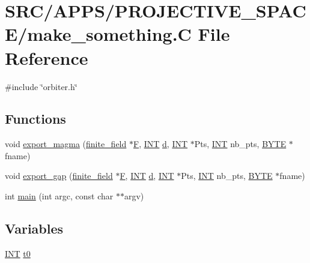 \hypertarget{make__something_8_c}{}\section{S\+R\+C/\+A\+P\+P\+S/\+P\+R\+O\+J\+E\+C\+T\+I\+V\+E\+\_\+\+S\+P\+A\+C\+E/make\+\_\+something.C File Reference}
\label{make__something_8_c}
{\ttfamily \#include \char`\"{}orbiter.\+h\char`\"{}}\newline
\subsection*{Functions}
\begin{DoxyCompactItemize}
\item 
void \mbox{\hyperlink{make__something_8_c_a24d47d809bb1982155fab1fa6e86b7b6}{export\+\_\+magma}} (\mbox{\hyperlink{classfinite__field}{finite\+\_\+field}} $\ast$\mbox{\hyperlink{simeon_8_c_a21a61c535ff7d9d4b674461d3b19fffa}{F}}, \mbox{\hyperlink{galois_8h_a09fddde158a3a20bd2dcadb609de11dc}{I\+NT}} \mbox{\hyperlink{simeon_8_c_a4339ca06fa882e69473d37bd6d7917d1}{d}}, \mbox{\hyperlink{galois_8h_a09fddde158a3a20bd2dcadb609de11dc}{I\+NT}} $\ast$Pts, \mbox{\hyperlink{galois_8h_a09fddde158a3a20bd2dcadb609de11dc}{I\+NT}} nb\+\_\+pts, \mbox{\hyperlink{galois_8h_ab6cc7b4aeb6ea31aba2b3fbfc83ff5e6}{B\+Y\+TE}} $\ast$fname)
\item 
void \mbox{\hyperlink{make__something_8_c_a2df5ce810ead281d3e2c885149bcfb7c}{export\+\_\+gap}} (\mbox{\hyperlink{classfinite__field}{finite\+\_\+field}} $\ast$\mbox{\hyperlink{simeon_8_c_a21a61c535ff7d9d4b674461d3b19fffa}{F}}, \mbox{\hyperlink{galois_8h_a09fddde158a3a20bd2dcadb609de11dc}{I\+NT}} \mbox{\hyperlink{simeon_8_c_a4339ca06fa882e69473d37bd6d7917d1}{d}}, \mbox{\hyperlink{galois_8h_a09fddde158a3a20bd2dcadb609de11dc}{I\+NT}} $\ast$Pts, \mbox{\hyperlink{galois_8h_a09fddde158a3a20bd2dcadb609de11dc}{I\+NT}} nb\+\_\+pts, \mbox{\hyperlink{galois_8h_ab6cc7b4aeb6ea31aba2b3fbfc83ff5e6}{B\+Y\+TE}} $\ast$fname)
\item 
int \mbox{\hyperlink{make__something_8_c_a217dbf8b442f20279ea00b898af96f52}{main}} (int argc, const char $\ast$$\ast$argv)
\end{DoxyCompactItemize}
\subsection*{Variables}
\begin{DoxyCompactItemize}
\item 
\mbox{\hyperlink{galois_8h_a09fddde158a3a20bd2dcadb609de11dc}{I\+NT}} \mbox{\hyperlink{make__something_8_c_a4268f4fe222ffb119218a0199f5e1904}{t0}}
\end{DoxyCompactItemize}


